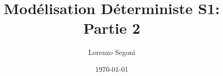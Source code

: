 \documentclass[12pt,a4paper]{book}
\begin{document}
\frontmatter
\title{Modélisation Déterministe S1: Partie 2}
\author{Lorenzo Segoni}
\date{\today}
\maketitle

\tableofcontents

\mainmatter

\end{document}
